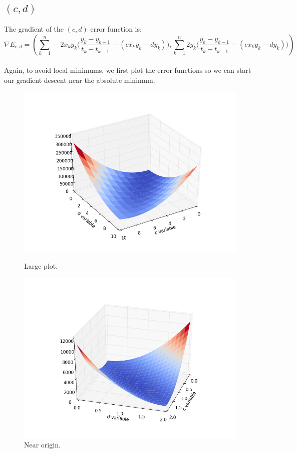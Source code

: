 \documentclass{article}
\begin{document}
\subsection{$(c,d)$}
The gradient of the $(c,d)$ error function is:
\begin{equation*}
  \nabla E_{c,d}=
  \left (
    \sum_{k=1}^{n}-2x_ky_k\Big(\frac{y_k-y_{k-1}}{t_k-t_{k-1}}-(cx_ky_k-dy_k)\Big),
    \sum_{k=1}^{n}2y_k\Big(\frac{y_k-y_{k-1}}{t_k-t_{k-1}}-(cx_ky_k-dy_k)\Big)
  \right )
\end{equation*}\\
Again, to avoid local minimums, we first plot the error functions so we can start our gradient descent near the absolute minimum.
\\
\begin{figure}[H]
  \centering
  \begin{minipage}[t]{0.49\textwidth}
    \includegraphics[width=\textwidth]{exercise6/cd_error_big.png}
    \caption*{Large plot.}
  \end{minipage}
  \begin{minipage}[t]{0.49\textwidth}
    \includegraphics[width=\textwidth]{exercise6/cd_error_small.png}
    \caption*{Near origin.}
  \end{minipage}
\end{figure}
\end{document}
